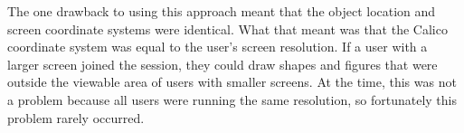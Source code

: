 The one drawback to using this approach meant that the object location and screen coordinate systems were identical. What that meant was that the Calico coordinate system was equal to the user's screen resolution. If a user with a larger screen joined the session, they could draw shapes and figures that were outside the viewable area of users with smaller screens. At the time, this was not a problem because all users were running the same resolution, so fortunately this problem rarely occurred.